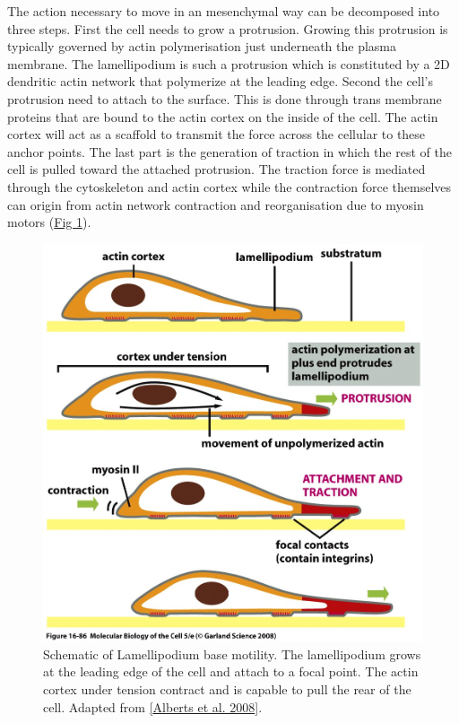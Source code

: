 \documentclass[A4paperpaper,11pt,english]{sphinxmanual}
\begin{document}
The action necessary to move in an mesenchymal way can be decomposed into three
steps. First the cell needs to grow a protrusion. Growing this protrusion is
typically governed by actin polymerisation just underneath the plasma membrane. The
lamellipodium is such a protrusion which is constituted by a 2D dendritic actin network
that polymerize at the leading edge. Second the cell's protrusion
need to attach to the surface. This is done through trans membrane proteins
that are bound to the actin cortex on the inside of the cell. The actin cortex
will act as a scaffold to transmit the force across the cellular to these
anchor points. The last part is the generation of traction in which the rest of the cell is pulled
toward the attached protrusion. The traction force is mediated through the
cytoskeleton and actin cortex while the contraction force themselves can origin
from actin network contraction and reorganisation due to myosin motors (\hyperref[index-latex:fig-lam-principle]{Fig  \ref*{index-latex:fig-lam-principle}}).
\begin{figure}[htbp]
\centering
\capstart

\includegraphics[width=0.900\linewidth]{figure-16-86.jpg}
\caption{Schematic of Lamellipodium base motility. The lamellipodium grows at the
leading edge of the cell and attach to a focal point. The actin cortex
under tension contract and is capable to pull the rear of the cell. Adapted
from {\hyperref[index-latex:alberts2008]{{[}Alberts et al. 2008{]}}}.}\label{index-latex:fig-lam-principle}\end{figure}
\end{document}
